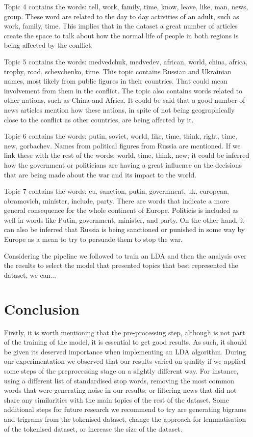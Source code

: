 \documentclass[twoside,12pt,a4paper]{article}
\begin{document}
Topic 4 contains the words: tell, work, family, time, know, leave, like, man, news, group. These word are related to the day to day activities of an adult, such as work, family, time. This implies that in the dataset a great number of articles create the space to talk about how the normal life of people in both regions is being affected by the conflict. 

Topic 5 contains the words: medvedchuk, medvedev, african, world, china, africa, trophy, road, schevchenko, time. This topic contains Russian and Ukrainian names, most likely from public figures in their countries. That could mean involvement from them in the conflict. The topic also contains words related to other nations, such as China and Africa. It could be said that a good number of news articles mention how these nations, in spite of not being geographically close to the conflict as other countries, are being affected by it.

Topic 6 contains the words: putin, soviet, world, like, time, think, right, time, new, gorbachev. Names from political figures from Russia are mentioned. If we link these with the rest of the words: world, time, think, new; it could be inferred how the government or politicians are having a great influence on the decisions that are being made about the war and its impact to the world.

Topic 7 contains the words: eu, sanction, putin, government, uk, european, abramovich, minister, include, party. There are words that indicate a more general consequence for the whole continent of Europe. Politicis is included as well in words like Putin, government, minister, and party. On the other hand, it can also be inferred that Russia is being sanctioned or punished in some way by Europe as a mean to try to persuade them to stop the war.

Considering the pipeline we followed to train an LDA and then the analysis over the results to select the model that presented topics that best represented the dataset, we can...

\clearpage
\section{Conclusion}
Firstly, it is worth mentioning that the pre-processing step, although is not part of the training of the model, it is essential to get good results. As such, it should be given its deserved importance when implementing an LDA algorithm. During our experimentation we observed that our results varied on quality if we applied some steps of the preprocessing stage on a slightly different way. For instance, using a different list of standardised stop words, removing the most common words that were generating noise in our results; or filtering news that did not share any similarities with the main topics of the rest of the dataset. Some additional steps for future research we recommend to try are generating bigrams and trigrams from the tokenised dataset, change the approach for lemmatisation of the tokenised dataset, or increase the size of the dataset. 
\end{document}
